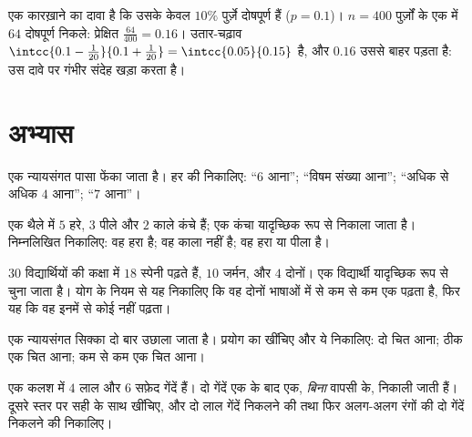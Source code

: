 \begin{example}\label{ex:g10:proba:test}
एक कारख़ाने का दावा है कि उसके केवल $10\%$ पुर्ज़े दोषपूर्ण हैं ($p = 0.1$)।
$n = 400$ पुर्ज़ों के एक  में $64$ दोषपूर्ण निकले: प्रेक्षित  $\frac{64}{400} = 0.16$। उतार-चढ़ाव  $\intcc{0.1 - \frac{1}{20}}{0.1 + \frac{1}{20}} = \intcc{0.05}{0.15}$ है, और $0.16$ उससे बाहर पड़ता है:
 उस दावे पर गंभीर संदेह खड़ा करता है।
\end{example}

\section{अभ्यास}

\begin{exercise}[$\star$]\label{exo:g10:proba:1}
एक न्यायसंगत पासा फेंका जाता है। हर  की  निकालिए: ``$6$
आना''; ``विषम संख्या आना''; ``अधिक से अधिक $4$ आना''; ``$7$ आना''।
\end{exercise}

\begin{exercise}[$\star$]\label{exo:g10:proba:2}
एक थैले में $5$ हरे, $3$ पीले और $2$ काले कंचे हैं; एक कंचा यादृच्छिक
रूप से निकाला जाता है। निम्नलिखित  निकालिए: वह हरा है; वह काला नहीं
है; वह हरा या पीला है।
\end{exercise}

\begin{exercise}[$\star$]\label{exo:g10:proba:3}
$30$ विद्यार्थियों की कक्षा में $18$ स्पेनी पढ़ते हैं, $10$ जर्मन, और
$4$ दोनों। एक विद्यार्थी यादृच्छिक रूप से चुना जाता है। योग के नियम से
यह  निकालिए कि वह दोनों भाषाओं में से कम से कम एक पढ़ता है, फिर यह
कि वह इनमें से कोई नहीं पढ़ता।
\end{exercise}

\begin{exercise}[$\star$]\label{exo:g10:proba:4}
एक न्यायसंगत सिक्का दो बार उछाला जाता है। प्रयोग का  खींचिए और ये
 निकालिए: दो चित आना; ठीक एक चित आना; कम से कम एक चित आना।
\end{exercise}

\begin{exercise}[$\star\star$]\label{exo:g10:proba:5}
एक कलश में $4$ लाल और $6$ सफ़ेद गेंदें हैं। दो गेंदें एक के बाद एक,
\emph{बिना} वापसी के, निकाली जाती हैं। दूसरे स्तर पर सही  के
साथ  खींचिए, और दो लाल गेंदें निकलने की तथा फिर अलग-अलग रंगों की दो
गेंदें निकलने की  निकालिए।
\end{exercise}

